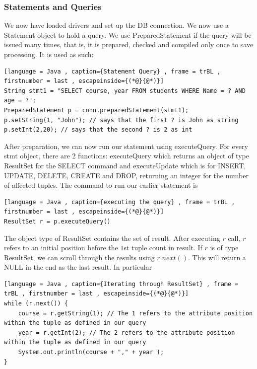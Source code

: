 \documentclass[a4paper]{article}
\theoremstyle{plain}
\theoremstyle{definition}
\theoremstyle{remark}
\begin{document}
\subsubsection{Statements and Queries}
We now have loaded drivers and set up the DB connection. We now use a Statement object to hold a query. We use PreparedStatement if the query will be issued many times, that is, it is prepared, checked and compiled only once to save processing. It is used as such:
\begin{lstlisting}[language = Java , caption={Statement Query} , frame = trBL , firstnumber = last , escapeinside={(*@}{@*)}]
String stmt1 = "SELECT course, year FROM students WHERE Name = ? AND age = ?";
PreparedStatement p = conn.preparedStatement(stmt1);
p.setString(1, "John"); // says that the first ? is John as string
p.setInt(2,20); // says that the second ? is 2 as int
\end{lstlisting}
After preparation, we can now run our statement using executeQuery. For every stmt object, there are 2 functions: executeQuery which returns an object of type ResultSet for the SELECT command and executeUpdate which is for INSERT, UPDATE, DELETE, CREATE and DROP, returning an integer for the number of affected tuples. The command to run our earlier statement is
\begin{lstlisting}[language = Java , caption={executing the query} , frame = trBL , firstnumber = last , escapeinside={(*@}{@*)}]
ResultSet r = p.executeQuery()
\end{lstlisting}
The object type of ResultSet contains the set of result. After executing $r$ call, $r$ refers to an initial position before the $1 $st tuple count in result. If $r$ is of type ResultSet, we can scroll through the results using $r.next()$. This will return a NULL in the end as the last result. In particular
\begin{lstlisting}[language = Java , caption={Iterating through ResultSet} , frame = trBL , firstnumber = last , escapeinside={(*@}{@*)}]
while (r.next()) {
	course = r.getString(1); // The 1 refers to the attribute position within the tuple as defined in our query
	year = r.getInt(2); // The 2 refers to the attribute position within the tuple as defined in our query
	System.out.println(course + "," + year );
}
\end{lstlisting}
\end{document}
